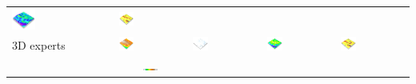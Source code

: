 \documentclass[prodmode,acmtochi]{acmsmall} %
\begin{document}
\begin{table}
{\begin{tabular}{m{} m{} m{} m{} m{}}
\includegraphics[width=0.24\textwidth]{images/render_3d/3d_novices/mean_slope_4.png} &
\includegraphics[width=0.24\textwidth]{images/render_3d/3d_novices/mean_forms_4.png}\\
%
3D experts & 
\includegraphics[width=0.24\textwidth]{images/render_3d/3d_experts/mean_dem_4.png} &
\includegraphics[width=0.24\textwidth]{images/render_3d/3d_experts/stdev_regression_difference_series_4.png} &
\includegraphics[width=0.24\textwidth]{images/render_3d/3d_experts/mean_slope_4.png} &
\includegraphics[width=0.24\textwidth]{images/render_3d/3d_experts/mean_forms_4.png}\\
%
& 
\multicolumn{1}{c}{\includegraphics[width=0.22\textwidth]{images/legends/elevation_legend_4.pdf}} &

\end{tabular}}
\end{table}
\end{document}
